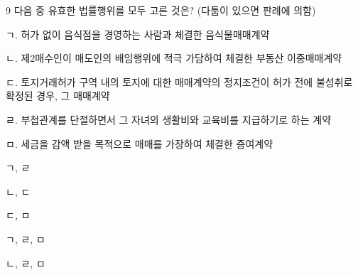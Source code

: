 \begin{question}{9}
다음 중 유효한 법률행위를 모두 고른 것은? (다툼이 있으면 판례에 의함)
\begin{framedtext}
ㄱ. 허가 없이 음식점을 경영하는 사람과 체결한 음식물매매계약 \par
ㄴ. 제2매수인이 매도인의 배임행위에 적극 가담하여 체결한 부동산 이중매매계약 \par
ㄷ. 토지거래허가 구역 내의 토지에 대한 매매계약의 정지조건이 허가 전에 불성취로 확정된 경우, 그 매매계약 \par
ㄹ. 부첩관계를 단절하면서 그 자녀의 생활비와 교육비를 지급하기로 하는 계약 \par
ㅁ. 세금을 감액 받을 목적으로 매매를 가장하여 체결한 증여계약 \par
\end{framedtext}
\begin{choices}
  \item ㄱ, ㄹ
  \item ㄴ, ㄷ
  \item ㄷ, ㅁ
  \item ㄱ, ㄹ, ㅁ
  \item ㄴ, ㄹ, ㅁ
\end{choices}
\end{question}

